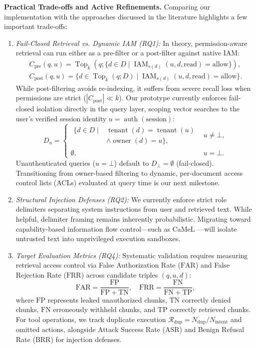 \documentclass[sigconf]{acmart}
\begin{document}
\textbf{Practical Trade-offs and Active Refinements.} Comparing our implementation with the approaches discussed in the literature highlights a few important trade-offs:
\begin{enumerate}
  \item \emph{Fail-Closed Retrieval vs. Dynamic IAM (RQ1):} In theory, permission-aware retrieval can run either as a pre-filter or a post-filter against native IAM:
  \[
  \begin{gathered}
  C_{\text{pre}}(q,u) = \operatorname{Top}_k(q; \{d \in D \mid \operatorname{IAM}_{s(d)}(u, d, \text{read}) = \text{allow}\}), \\
  C_{\text{post}}(q,u) = \{d \in \operatorname{Top}_k(q; D) \mid \operatorname{IAM}_{s(d)}(u, d, \text{read}) = \text{allow}\}.
  \end{gathered}
  \]
  While post-filtering avoids re-indexing, it suffers from severe recall loss when permissions are strict ($|C_{\text{post}}| \ll k$). Our prototype currently enforces fail-closed isolation directly in the query layer, scoping vector searches to the user's verified session identity $u = \operatorname{auth}(\text{session})$:
  \[
  D_u = \begin{cases}
  \begin{aligned}
  \{d \in D \mid {} & \operatorname{tenant}(d) = \operatorname{tenant}(u) \\
  & \wedge \operatorname{owner}(d) = u\},
  \end{aligned} & u \neq \bot, \\
  \emptyset, & u = \bot.
  \end{cases}
  \]
  Unauthenticated queries ($u=\bot$) default to $D_\bot = \emptyset$ (fail-closed). Transitioning from owner-based filtering to dynamic, per-document access control lists (ACLs) evaluated at query time \cite{jeonglee2025permissionawarerag} is our next milestone.
  \item \emph{Structural Injection Defenses (RQ2):} We currently enforce strict role delimiters separating system instructions from user and retrieved text. While helpful, delimiter framing remains inherently probabilistic. Migrating toward capability-based information flow control—such as CaMeL \cite{debenedetti2026camel}—will isolate untrusted text into unprivileged execution sandboxes.
  \item \emph{Target Evaluation Metrics (RQ4):} Systematic validation requires measuring retrieval access control via False Authorization Rate ($\mathrm{FAR}$) and False Rejection Rate ($\mathrm{FRR}$) across candidate triples $(q,u,d)$:
  \[
  \mathrm{FAR} = \frac{\mathrm{FP}}{\mathrm{FP} + \mathrm{TN}}, \quad \mathrm{FRR} = \frac{\mathrm{FN}}{\mathrm{FN} + \mathrm{TP}},
  \]
  where $\mathrm{FP}$ represents leaked unauthorized chunks, $\mathrm{TN}$ correctly denied chunks, $\mathrm{FN}$ erroneously withheld chunks, and $\mathrm{TP}$ correctly retrieved chunks. For tool operations, we track duplicate execution $\mathcal{R}_{\mathrm{dup}} = N_{\mathrm{dup}} / N_{\mathrm{intent}}$ and omitted actions, alongside Attack Success Rate ($\mathrm{ASR}$) and Benign Refusal Rate ($\mathrm{BRR}$) for injection defenses.
\end{enumerate}
\end{document}
